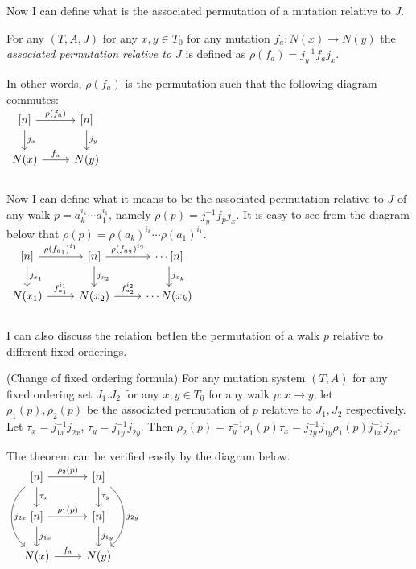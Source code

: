 \indent Now I can define what is the associated permutation of a mutation relative to $J$.\\
\begin{definition}
For any $(T,A,J)$ for any $x,y\in T_0$ for any mutation $f_a:N(x)\to N(y)$ the \textit{associated permutation relative to $J$} is defined as $\rho(f_a)=j_y^{-1}f_aj_x$.
\end{definition}
\indent In other words, $\rho(f_a)$ is the permutation such that the following diagram commutes:\\
$\begin{tikzcd}
{[n]} \arrow[r,"\rho(f_a)"] \arrow[d,"j_x"] & {[n]}\arrow[d,"j_y"]\\
N(x) \arrow[r,"f_a"] & N(y)\\
\end{tikzcd}$\\
\indent Now I can define what it means to be the associated permutation relative to $J$ of any walk $p=a_k^{i_k}\cdots a_1^{i_1}$, namely $\rho(p)=j_y^{-1}f_pj_x$. It is easy to see from the diagram below that $\rho(p)=\rho(a_k)^{i_k}\cdots \rho(a_1)^{i_1}$.\\
$\begin{tikzcd}
{[n]} \arrow[r,"\rho(f_{a_1})^{i_1}"] \arrow[d,"j_{x_1}"] & {[n]}\arrow[r,"\rho(f_{a_2})^{i_2}"]\arrow[d,"j_{x_2}"] & \cdots {[n]}\arrow[d,"j_{x_k}"]\\
N(x_1) \arrow[r,"f_{a_1}^{i_1}"] & N(x_2)\arrow[r,"f_{a_2}^{i_2}"]  & \cdots N(x_k)\\
\end{tikzcd}$\\
\indent I can also discuss the relation betIen the permutation of a walk $p$ relative to different fixed orderings.\\
\begin{theorem}
(Change of fixed ordering formula) For any mutation system $(T,A)$ for any fixed ordering set $J_1.J_2$ for any $x,y\in T_0$ for any walk $p:x\to y$, let $\rho_1(p),\rho_2(p)$ be the associated permutation of $p$ relative to $J_1,J_2$ respectively. Let $\tau_x=j_{1x}^{-1}j_{2x}$, $\tau_y=j_{1y}^{-1}j_{2y}$. Then $\rho_2(p)=\tau_y^{-1}\rho_1(p)\tau_x=j_{2y}^{-1}j_{1y}\rho_1(p)j_{1x}^{-1}j_{2x}$.\\
\end{theorem}
\indent The theorem can be verified easily by the diagram below.\\
$\begin{tikzcd}
{[n]} \arrow[r,"\rho_2(p)"]\arrow[d,"\tau_x"]\arrow[dd,bend right = 50,"j_{2x}"] & {[n]}\arrow[d,"\tau_y"]\arrow[dd,bend left = 50,"j_{2y}"] \\
{[n]} \arrow[r,"\rho_1(p)"] \arrow[d,"j_{1x}"] & {[n]}\arrow[d,"j_{1y}"]\\
N(x) \arrow[r,"f_a"] & N(y)\\
\end{tikzcd}$\\
